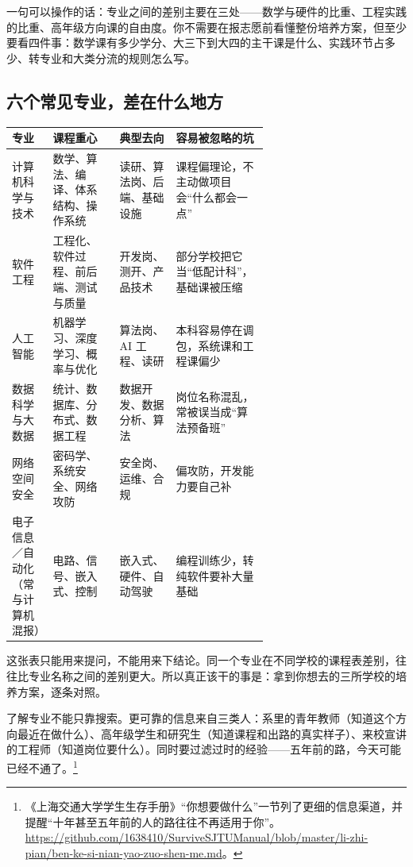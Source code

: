 \documentclass[UTF8,zihao=5,openany]{ctexbook}
\begin{document}
一句可以操作的话：专业之间的差别主要在三处——数学与硬件的比重、工程实践的比重、高年级方向课的自由度。你不需要在报志愿前看懂整份培养方案，但至少要看四件事：数学课有多少学分、大三下到大四的主干课是什么、实践环节占多少、转专业和大类分流的规则怎么写。

\subsection{六个常见专业，差在什么地方}
\begin{center}\footnotesize
\begin{tabularx}{\linewidth}{p{0.16\linewidth}p{0.26\linewidth}p{0.22\linewidth}Y}
\toprule
专业 & 课程重心 & 典型去向 & 容易被忽略的坑 \\
\midrule
计算机科学与技术 & 数学、算法、编译、体系结构、操作系统 & 读研、算法岗、后端、基础设施 & 课程偏理论，不主动做项目会“什么都会一点” \\
软件工程 & 工程化、软件过程、前后端、测试与质量 & 开发岗、测开、产品技术 & 部分学校把它当“低配计科”，基础课被压缩 \\
人工智能 & 机器学习、深度学习、概率与优化 & 算法岗、AI 工程、读研 & 本科容易停在调包，系统课和工程课偏少 \\
数据科学与大数据 & 统计、数据库、分布式、数据工程 & 数据开发、数据分析、算法 & 岗位名称混乱，常被误当成“算法预备班” \\
网络空间安全 & 密码学、系统安全、网络攻防 & 安全岗、运维、合规 & 偏攻防，开发能力要自己补 \\
电子信息／自动化（常与计算机混报） & 电路、信号、嵌入式、控制 & 嵌入式、硬件、自动驾驶 & 编程训练少，转纯软件要补大量基础 \\
\bottomrule
\end{tabularx}
\end{center}

这张表只能用来提问，不能用来下结论。同一个专业在不同学校的课程表差别，往往比专业名称之间的差别更大。所以真正该干的事是：拿到你想去的三所学校的培养方案，逐条对照。

了解专业不能只靠搜索。更可靠的信息来自三类人：系里的青年教师（知道这个方向最近在做什么）、高年级学生和研究生（知道课程和出路的真实样子）、来校宣讲的工程师（知道岗位要什么）。同时要过滤过时的经验——五年前的路，今天可能已经不通了。\footnote{《上海交通大学学生生存手册》“你想要做什么”一节列了更细的信息渠道，并提醒“十年甚至五年前的人的路往往不再适用于你”。\url{https://github.com/1638410/SurviveSJTUManual/blob/master/li-zhi-pian/ben-ke-si-nian-yao-zuo-shen-me.md}。}
\end{document}
